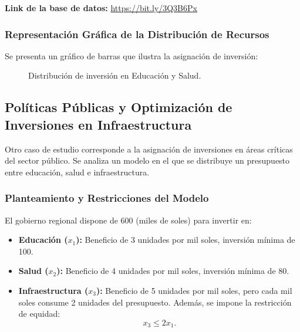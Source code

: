 	\textbf{Link de la base de datos:} \url{https://bit.ly/3Q3B6Px}
	
	\subsubsection{Representación Gráfica de la Distribución de Recursos}
	Se presenta un gráfico de barras que ilustra la asignación de inversión:
	
	\begin{figure}[H]
		\centering
		\caption{Distribución de inversión en Educación y Salud.}
		\label{fig:inversion_publica}
	\end{figure}
	
	\newpage
	
	\subsection{Políticas Públicas y Optimización de Inversiones en Infraestructura}
	Otro caso de estudio corresponde a la asignación de inversiones en áreas críticas del sector público. Se analiza un modelo en el que se distribuye un presupuesto entre educación, salud e infraestructura.
	
	\subsubsection{Planteamiento y Restricciones del Modelo}
	El gobierno regional dispone de 600 (miles de soles) para invertir en:
	\begin{itemize}
		\item \textbf{Educación ($x_1$):} Beneficio de 3 unidades por mil soles, inversión mínima de 100.
		\item \textbf{Salud ($x_2$):} Beneficio de 4 unidades por mil soles, inversión mínima de 80.
		\item \textbf{Infraestructura ($x_3$):} Beneficio de 5 unidades por mil soles, pero cada mil soles consume 2 unidades del presupuesto. Además, se impone la restricción de equidad:
		\[
		x_3 \leq 2x_1.
		\]
	\end{itemize}
	
